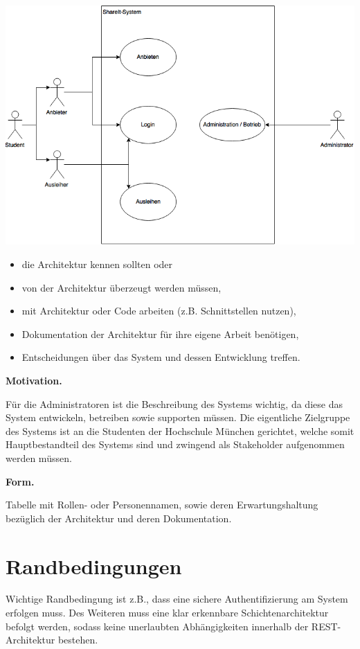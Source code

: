 \documentclass[]{article}
\begin{document}
\includegraphics{images/UseCaseDiagram.png}
\begin{itemize}
\item
  die Architektur kennen sollten oder
\item
  von der Architektur überzeugt werden müssen,
\item
  mit Architektur oder Code arbeiten (z.B. Schnittstellen nutzen),
\item
  Dokumentation der Architektur für ihre eigene Arbeit benötigen,
\item
  Entscheidungen über das System und dessen Entwicklung treffen.
\end{itemize}

\textbf{Motivation.}

Für die Administratoren ist die Beschreibung des Systems wichtig, da diese das System entwickeln, betreiben sowie supporten müssen.
Die eigentliche Zielgruppe des Systems ist an die Studenten der Hochschule München gerichtet, welche somit Hauptbestandteil des Systems sind und zwingend als Stakeholder aufgenommen werden müssen.

\textbf{Form.}

Tabelle mit Rollen- oder Personennamen, sowie deren Erwartungshaltung
bezüglich der Architektur und deren Dokumentation.


\section{Randbedingungen}\label{section-architecture-constraints}

Wichtige Randbedingung ist z.B., dass eine sichere Authentifizierung am System erfolgen muss. Des Weiteren muss eine klar erkennbare Schichtenarchitektur befolgt werden, sodass keine unerlaubten Abhängigkeiten innerhalb der REST-Architektur bestehen.
\end{document}
